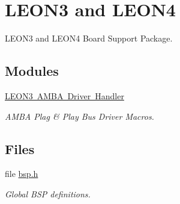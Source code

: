 \hypertarget{group__RTEMSBSPsSPARCLEON3}{}\section{L\+E\+O\+N3 and L\+E\+O\+N4}
\label{group__RTEMSBSPsSPARCLEON3}


L\+E\+O\+N3 and L\+E\+O\+N4 Board Support Package.  


\subsection*{Modules}
\begin{DoxyCompactItemize}
\item 
\mbox{\hyperlink{group__RTEMSBSPsSPARCLEON3AMBA}{L\+E\+O\+N3 A\+M\+B\+A Driver Handler}}
\begin{DoxyCompactList}\small\item\em A\+M\+BA Plag \& Play Bus Driver Macros. \end{DoxyCompactList}\end{DoxyCompactItemize}
\subsection*{Files}
\begin{DoxyCompactItemize}
\item 
file \mbox{\hyperlink{bsps_2sparc_2leon3_2include_2bsp_8h}{bsp.\+h}}
\begin{DoxyCompactList}\small\item\em Global B\+SP definitions. \end{DoxyCompactList}\end{DoxyCompactItemize}
